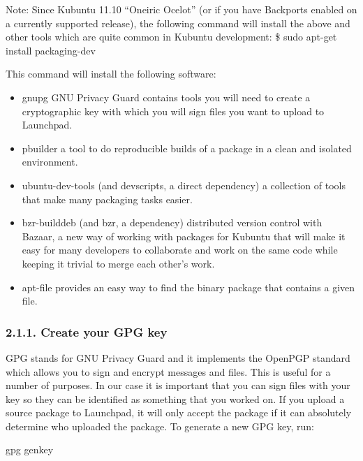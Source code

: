 \documentclass[letterpaper,10pt,english]{sphinxmanual}
\begin{document}
Note: Since Kubuntu 11.10 “Oneiric Ocelot” (or if you have Backports enabled on a currently supported release), the following command will install the above and other tools which are quite common in Kubuntu development:
\$ sudo apt-get install packaging-dev

This command will install the following software:
\begin{itemize}
\item {} 
gnupg \textendash{} GNU Privacy Guard contains tools you will need to create a cryptographic key with which you will sign files you want to upload to Launchpad.

\item {} 
pbuilder \textendash{} a tool to do reproducible builds of a package in a clean and isolated environment.

\item {} 
ubuntu-dev-tools (and devscripts, a direct dependency) \textendash{} a collection of tools that make many packaging tasks easier.

\item {} 
bzr-builddeb (and bzr, a dependency) \textendash{} distributed version control with Bazaar, a new way of working with packages for Kubuntu that will make it easy for many developers to collaborate and work on the same code while keeping it trivial to merge each other’s work.

\item {} 
apt-file provides an easy way to find the binary package that contains a given file.

\end{itemize}


\subsubsection{2.1.1. Create your GPG key}
\label{\detokenize{docs/packaging_guide/getting_started:create-your-gpg-key}}
GPG stands for GNU Privacy Guard and it implements the OpenPGP standard which allows you to sign and encrypt messages and files. This is useful for a number of purposes. In our case it is important that you can sign files with your key so they can be identified as something that you worked on. If you upload a source package to Launchpad, it will only accept the package if it can absolutely determine who uploaded the package.
To generate a new GPG key, run:

\begin{sphinxVerbatim}[commandchars=\\\{\}]
\PYGZdl{} gpg \PYGZhy{}\PYGZhy{}gen\PYGZhy{}key
\end{sphinxVerbatim}
\end{document}
